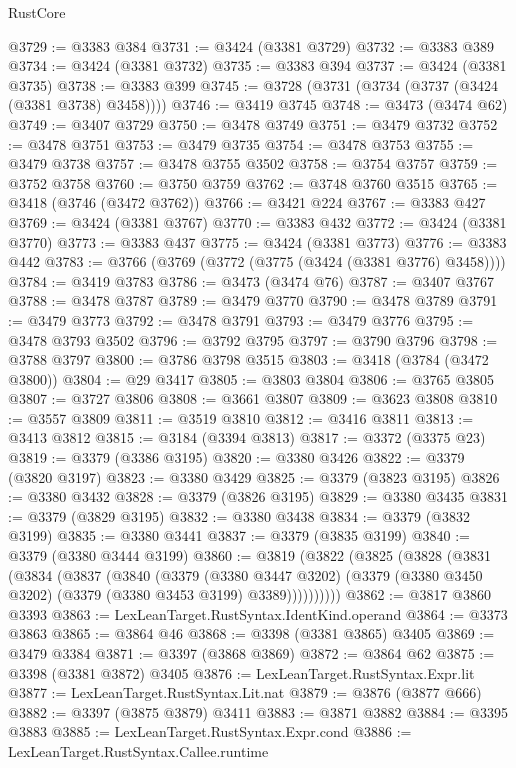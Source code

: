 \begin{lexlean}{RustCore}
\begin{coremodule}
@3729 := @3383 @384
@3731 := @3424 (@3381 @3729)
@3732 := @3383 @389
@3734 := @3424 (@3381 @3732)
@3735 := @3383 @394
@3737 := @3424 (@3381 @3735)
@3738 := @3383 @399
@3745 := @3728 (@3731 (@3734 (@3737 (@3424 (@3381 @3738) @3458))))
@3746 := @3419 @3745
@3748 := @3473 (@3474 @62)
@3749 := @3407 @3729
@3750 := @3478 @3749
@3751 := @3479 @3732
@3752 := @3478 @3751
@3753 := @3479 @3735
@3754 := @3478 @3753
@3755 := @3479 @3738
@3757 := @3478 @3755 @3502
@3758 := @3754 @3757
@3759 := @3752 @3758
@3760 := @3750 @3759
@3762 := @3748 @3760 @3515
@3765 := @3418 (@3746 (@3472 @3762))
@3766 := @3421 @224
@3767 := @3383 @427
@3769 := @3424 (@3381 @3767)
@3770 := @3383 @432
@3772 := @3424 (@3381 @3770)
@3773 := @3383 @437
@3775 := @3424 (@3381 @3773)
@3776 := @3383 @442
@3783 := @3766 (@3769 (@3772 (@3775 (@3424 (@3381 @3776) @3458))))
@3784 := @3419 @3783
@3786 := @3473 (@3474 @76)
@3787 := @3407 @3767
@3788 := @3478 @3787
@3789 := @3479 @3770
@3790 := @3478 @3789
@3791 := @3479 @3773
@3792 := @3478 @3791
@3793 := @3479 @3776
@3795 := @3478 @3793 @3502
@3796 := @3792 @3795
@3797 := @3790 @3796
@3798 := @3788 @3797
@3800 := @3786 @3798 @3515
@3803 := @3418 (@3784 (@3472 @3800))
@3804 := @29 @3417
@3805 := @3803 @3804
@3806 := @3765 @3805
@3807 := @3727 @3806
@3808 := @3661 @3807
@3809 := @3623 @3808
@3810 := @3557 @3809
@3811 := @3519 @3810
@3812 := @3416 @3811
@3813 := @3413 @3812
@3815 := @3184 (@3394 @3813)
@3817 := @3372 (@3375 @23)
@3819 := @3379 (@3386 @3195)
@3820 := @3380 @3426
@3822 := @3379 (@3820 @3197)
@3823 := @3380 @3429
@3825 := @3379 (@3823 @3195)
@3826 := @3380 @3432
@3828 := @3379 (@3826 @3195)
@3829 := @3380 @3435
@3831 := @3379 (@3829 @3195)
@3832 := @3380 @3438
@3834 := @3379 (@3832 @3199)
@3835 := @3380 @3441
@3837 := @3379 (@3835 @3199)
@3840 := @3379 (@3380 @3444 @3199)
@3860 := @3819
    (@3822
      (@3825
        (@3828
          (@3831
            (@3834
              (@3837
                (@3840
                  (@3379
                    (@3380 @3447 @3202)
                    (@3379 (@3380 @3450 @3202) (@3379 (@3380 @3453 @3199) @3389))))))))))
@3862 := @3817 @3860 @3393
@3863 := LexLeanTarget.RustSyntax.IdentKind.operand
@3864 := @3373 @3863
@3865 := @3864 @46
@3868 := @3398 (@3381 @3865) @3405
@3869 := @3479 @3384
@3871 := @3397 (@3868 @3869)
@3872 := @3864 @62
@3875 := @3398 (@3381 @3872) @3405
@3876 := LexLeanTarget.RustSyntax.Expr.lit
@3877 := LexLeanTarget.RustSyntax.Lit.nat
@3879 := @3876 (@3877 @666)
@3882 := @3397 (@3875 @3879) @3411
@3883 := @3871 @3882
@3884 := @3395 @3883
@3885 := LexLeanTarget.RustSyntax.Expr.cond
@3886 := LexLeanTarget.RustSyntax.Callee.runtime

\end{coremodule}
\end{lexlean}

